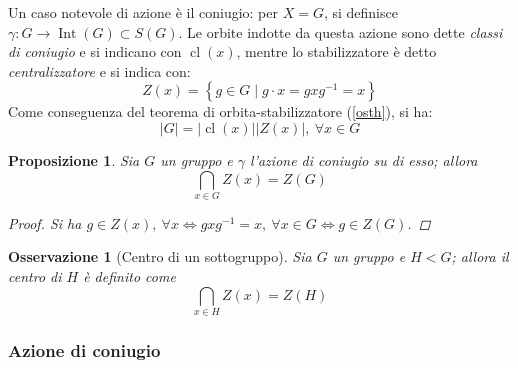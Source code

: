 \documentclass[11pt]{scrartcl}
\theoremstyle{style1}
\newtheorem{osservazione}{Osservazione}[section]
\newtheorem{prop}{Proposizione}[section]
\numberwithin{equation}{subsection}
\begin{document}
\noindent Un caso notevole di azione \`e il coniugio: per $X=G$, si definisce $\gamma : G \to \operatorname{Int} (G) \subset S(G)$.
Le orbite indotte da questa azione sono dette \textit{classi di coniugio} e si indicano con $\operatorname{cl} (x)$, mentre lo stabilizzatore \`e detto \textit{centralizzatore} e si indica con:
\begin{equation}
	Z(x) = \left\{ g \in G  \mid g \cdot x = gxg^{-1} = x \right\} 
\end{equation}
Come conseguenza del teorema di orbita-stabilizzatore (\ref{osth}), si ha:
\begin{equation}
	\lvert G \rvert  = \lvert \operatorname{cl} (x)  \rvert  \lvert Z(x) \rvert , \ \forall x \in G
\end{equation}
\begin{prop}
	Sia $G$ un gruppo e $\gamma$ l'azione di coniugio su di esso; allora
	\[
	\bigcap_{x \in G} Z(x) = Z(G)
	\] 
	\begin{proof}
		Si ha $g \in Z(x), \ \forall x \iff gxg^{-1} =x , \ \forall x \in G \iff g \in Z(G)$.
	\end{proof}
\end{prop}
\begin{osservazione}
	[Centro di un sottogruppo]
	Sia $G$ un gruppo e $H < G$; allora il centro di $H$ \`e definito come 
	\[
	\bigcap_{x \in H}  Z(x) = Z(H)
	\] 
\end{osservazione}

\subsubsection{Azione di coniugio}
\end{document}

